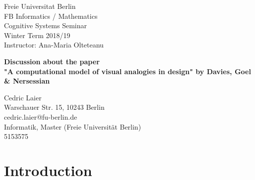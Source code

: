 \documentclass[12pt]{article}
\begin{document}
\noindent
Freie Universitat Berlin\\
FB Informatics / Mathematics\\
Cognitive Systems Seminar\\
Winter Term 2018/19\\
Instructor: Ana-Maria Olteteanu
\vspace{5cm}
\begin{center}
{\LARGE \textbf{Discussion about the paper \\"A computational model of visual analogies in design" by Davies, Goel \& Nersessian}}
\end{center}
\vspace{6,5cm}

\noindent
Cedric Laier \\
Warschauer Str. 15, 10243 Berlin \\
cedric.laier@fu-berlin.de\\
Informatik, Master (Freie Universität Berlin) \\
5153575 \\
\clearpage


\section{Introduction}
\end{document}
